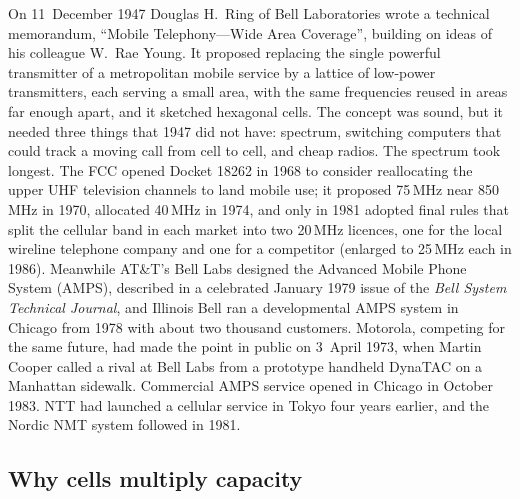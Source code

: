 \begin{history}
On 11~December 1947 Douglas H.~Ring of Bell Laboratories wrote a technical memorandum, ``Mobile
Telephony---Wide Area Coverage'', building on ideas of his colleague W.~Rae Young. It proposed
replacing the single powerful transmitter of a metropolitan mobile service by a lattice of
low-power transmitters, each serving a small area, with the same frequencies reused in areas far
enough apart, and it sketched hexagonal cells. The concept was sound, but it needed three things
that 1947 did not have: spectrum, switching computers that could track a moving call from cell to
cell, and cheap radios. The spectrum took longest. The FCC opened Docket 18262 in 1968 to consider
reallocating the upper UHF television channels to land mobile use; it proposed 75\,MHz near
850\,MHz in 1970, allocated 40\,MHz in 1974, and only in 1981 adopted final rules that split the
cellular band in each market into two 20\,MHz licences, one for the local wireline telephone company
and one for a competitor (enlarged to 25\,MHz each in 1986). Meanwhile AT\&T's Bell Labs designed the
Advanced Mobile Phone System (AMPS), described in a celebrated January 1979 issue of the \emph{Bell
System Technical Journal}, and Illinois Bell ran a developmental AMPS system in Chicago from 1978 with
about two thousand customers. Motorola, competing for the same future, had made the point in public
on 3~April 1973, when Martin Cooper called a rival at Bell Labs from a prototype handheld DynaTAC on a
Manhattan sidewalk. Commercial AMPS service opened in Chicago in October 1983. NTT had launched a
cellular service in Tokyo four years earlier, and the Nordic NMT system followed in 1981.
\end{history}

\subsection{Why cells multiply capacity}


